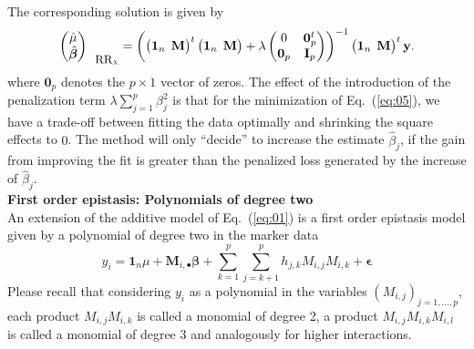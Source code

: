 \documentclass{bmcart}
\newcommand{\M}{\mathbf{M}}
\newcommand{\0}{\mathbf{0}}
\begin{document}
The corresponding solution is given by 
\begin{equation}
	\begin{pmatrix}
		\hat{\mu} \\
		\hat{\bm{\beta}}
	\end{pmatrix}_{\mbox{\small RR}_\lambda} =
	\left( 
	\begin{pmatrix}
		\mathbf{1}_n & \hspace{-0.2cm}\M
	\end{pmatrix}^{t}
	\begin{pmatrix}
		\mathbf{1}_n & \hspace{-0.2cm} \M
	\end{pmatrix} + \lambda \begin{pmatrix}
		0 & \mathbf{0 }_p^t \\
		\mathbf{0 }_p & \mathbf{I}_p
	\end{pmatrix} 
	\right)^{-1} 
	\begin{pmatrix}
		\mathbf{1}_n & \hspace{-0.2cm} \M
	\end{pmatrix}^{t}
	\mathbf{y}. \label{eq:06}
\end{equation}
where $\mathbf{0 }_p$ denotes the $p \times 1$ vector of zeros. The effect of the introduction of the penalization term $\lambda \sum\limits_{j=1}^p {\beta}_j^2$ is that for the minimization of Eq.~(\ref{eq:05}), we have a trade-off between fitting the data optimally and shrinking the square effects to $0$. The method will only ``decide'' to increase the estimate $\hat{\beta}_j$, if the gain from improving the fit is greater than the penalized loss generated by the increase of $\hat{\beta}_j$.  \vspace{0.4cm} \\
{\bf First order epistasis: Polynomials of degree two}\vspace{0.2cm}\\ 
An extension of the additive model of Eq.~(\ref{eq:01}) is a first order epistasis model given by a polynomial of degree two in the marker data \cite{ober15,jiang15,Martini16}
\begin{equation} \label{eq:07}
	y_i =\mathbf{1}_n \mu + \M_{i,\bullet}\bm{\beta} + \sum\limits_{k=1}^p\sum\limits_{j=k+1}^p h_{j,k}M_{i,j}M_{i,k} + \bm{\epsilon}
\end{equation}
Please recall that considering $y_i$ as a polynomial in the variables $(M_{i,j})_{j=1,...,p}$, each product $M_{i,j}M_{i,k}$ is called a monomial of degree 2, a product $M_{i,j}M_{i,k} M_{i,l}$ is called a monomial of degree 3 and analogously for higher interactions.
\\
\end{document}
